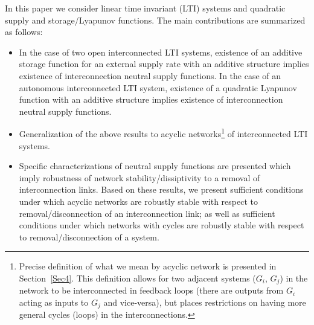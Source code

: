 \documentclass[11pt,a4paper,oneside,DIV=12,headings=small]{scrartcl}
\theoremstyle{plain}
\begin{document}

In this paper we consider linear time invariant (LTI) systems and quadratic supply and storage/Lyapunov functions. The main contributions are summarized as follows:
\begin{itemize}
\item In the case of two open interconnected LTI systems, existence of an additive storage function for an external supply rate with an additive structure implies existence of interconnection neutral supply functions. In the case of an autonomous interconnected LTI system, existence of a quadratic Lyapunov function with an additive structure implies existence of interconnection neutral supply functions.
\item Generalization of the above results to acyclic networks\footnote{Precise definition of what we mean by acyclic network is presented in Section~\ref{Sec4}. This definition allows for two adjacent systems ($G_i$, $G_j$) in the network to be interconnected in feedback loops (there are outputs from $G_i$ acting as inputs to $G_j$ and vice-versa), but places restrictions on having more general cycles (loops) in the interconnections.} of interconnected LTI systems.  
\item  Specific characterizations of neutral supply functions are presented which imply robustness of network stability/dissiptivity to a removal of interconnection links. Based on these results, we present sufficient conditions under which acyclic networks are robustly stable with respect to removal/disconnection of an interconnection link; as well as sufficient conditions under which networks with cycles are robustly stable with respect to removal/disconnection of a system.
\end{itemize}
\end{document}
